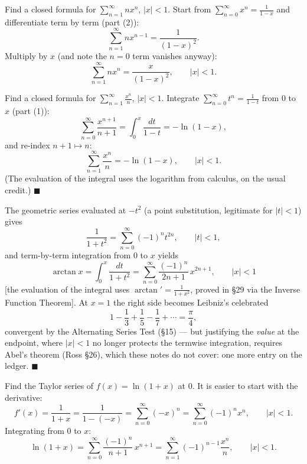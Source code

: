 \documentclass[11pt]{report}
\begin{document}
\begin{exbox}
Find a closed formula for $\sum_{n=1}^\infty n x^n$, $|x| < 1$. Start from $\sum_{n=0}^\infty x^n = \tfrac{1}{1-x}$ and differentiate term by term (part (2)):
\[
\sum_{n=1}^\infty n x^{n-1} = \frac{1}{(1-x)^2}.
\]
Multiply by $x$ (and note the $n = 0$ term vanishes anyway):
\[
\sum_{n=1}^\infty n x^n = \frac{x}{(1-x)^2}, \qquad |x| < 1. \tag*{$\blacksquare$}
\]
\end{exbox}

\begin{exbox}
Find a closed formula for $\sum_{n=1}^\infty \tfrac{x^n}{n}$, $|x| < 1$. Integrate $\sum_{n=0}^\infty t^n = \tfrac{1}{1-t}$ from $0$ to $x$ (part (1)):
\[
\sum_{n=0}^\infty \frac{x^{n+1}}{n+1} = \int_0^x \frac{dt}{1-t} = -\ln(1-x),
\]
and re-index $n+1 \mapsto n$:
\[
\sum_{n=1}^\infty \frac{x^n}{n} = -\ln(1-x), \qquad |x| < 1.
\]
(The evaluation of the integral uses the logarithm from calculus, on the usual credit.) \hfill $\blacksquare$
\end{exbox}

\begin{exbox}
The geometric series evaluated at $-t^2$ (a point substitution, legitimate for $|t| < 1$) gives
\[
\frac{1}{1+t^2} = \sum_{n=0}^\infty (-1)^n t^{2n}, \qquad |t| < 1,
\]
and term-by-term integration from $0$ to $x$ yields
\[
\arctan x = \int_0^x \frac{dt}{1+t^2} = \sum_{n=0}^\infty \frac{(-1)^n}{2n+1}\, x^{2n+1}, \qquad |x| < 1
\]
[the evaluation of the integral uses $\arctan' = \tfrac{1}{1+x^2}$, proved in \S 29 via the Inverse Function Theorem]. At $x = 1$ the right side becomes Leibniz's celebrated
\[
1 - \frac13 + \frac15 - \frac17 + \cdots = \frac\pi4,
\]
convergent by the Alternating Series Test (\S 15) --- but justifying the \emph{value} at the endpoint, where $|x| < 1$ no longer protects the termwise integration, requires Abel's theorem (Ross \S 26), which these notes do not cover: one more entry on the ledger. \hfill $\blacksquare$
\end{exbox}

\begin{exbox}
Find the Taylor series of $f(x) = \ln(1+x)$ at $0$. It is easier to start with the derivative:
\[
f'(x) = \frac{1}{1+x} = \frac{1}{1 - (-x)} = \sum_{n=0}^\infty (-x)^n = \sum_{n=0}^\infty (-1)^n x^n, \qquad |x| < 1.
\]
Integrating from $0$ to $x$:
\[
\ln(1+x) = \sum_{n=0}^\infty \frac{(-1)^n}{n+1}\, x^{n+1} = \sum_{n=1}^\infty (-1)^{n-1} \frac{x^n}{n}, \qquad |x| < 1. \tag*{$\blacksquare$}
\]
\end{exbox}
\end{document}
